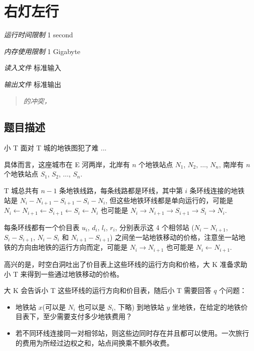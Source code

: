 \section[E. 右灯左行]{ 右灯左行}

\textit{运行时间限制}   1 second

\textit{内存使用限制} 1 Gigabyte

\textit{读入文件} \qquad 标准输入

\textit{输出文件} \qquad 标准输出


\begin{quote}
	\textit{的冲突，}
\end{quote}



\subsection{题目描述}

小 T 面对 T 城的地铁图犯了难 ...

具体而言，这座城市在 E 河两岸，北岸有 $n$ 个地铁站点 $N_1$, $N_2$, $\ldots$, $N_n$, 南岸有 $n$ 个地铁站点 $S_1$, $S_2$, $\ldots$, $S_n$.

T 城总共有 $n - 1$ 条地铁线路，每条线路都是环线，其中第 $i$ 条环线连接的地铁站是 $N_i - N_{i + 1} - S_{i + 1} - S_i - N_i$, 但这些地铁环线都是单向运行的，可能是 $N_i \leftarrow N_{i + 1} \leftarrow S_{i + 1} \leftarrow S_i \leftarrow N_i$ 也可能是 $N_i \rightarrow N_{i + 1} \rightarrow S_{i + 1} \rightarrow S_i \rightarrow N_i$.


每条环线都有一个价目表 $u_i$, $d_i$, $l_i$, $r_i$, 分别表示这 4 个相邻站 ($N_i - N_{i + 1}$, $S_i - S_{i + 1}$, $N_i - S_i$ 和 $N_{i + 1} - S_{i + 1}$) 之间坐一站地铁移动的价格，注意坐一站地铁的方向由地铁的运行方向而定，可能是 $N_i \rightarrow N_{i + 1}$ 也可能是 $N_{i} \leftarrow N_{i + 1}$.

高兴的是，时空白洞吐出了价目表上这些环线的运行方向和价格，大 K 准备求助小 T 来得到一些通过地铁移动的价格。

大 K 会告诉小 T 这些环线的运行方向和价目表，随后小 T 需要回答 $q$ 个问题：

\begin{itemize}
  \item  地铁站 $x$(可以是 $N_i$ 也可以是 $S_i$, 下略) 到地铁站 $y$ 坐地铁，在给定的地铁价目表下，至少需要支付多少地铁费用？
  \item 若不同环线连接同一对相邻站，则这些边同时存在并且都可以使用。一次旅行的费用为所经过边权之和，站点间换乘不额外收费。
\end{itemize}

